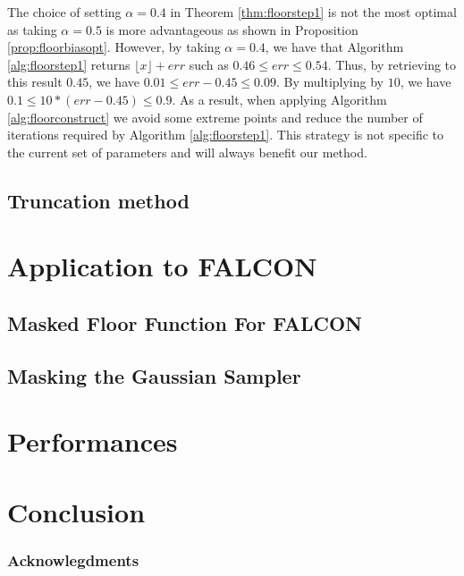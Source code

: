 \documentclass[runningheads]{llncs}
\begin{document}
\begin{remark}
  The choice of setting $\alpha=0.4$ in Theorem \ref{thm:floorstep1} is not the most optimal as taking $\alpha=0.5$ is more advantageous as shown in Proposition \ref{prop:floorbiasopt}. However, by taking $\alpha = 0.4$, we have that Algorithm \ref{alg:floorstep1} returns $\lfloor x \rfloor + err$ such as $0.46\leq err \leq 0.54$. Thus, by retrieving to this result $0.45$, we have $0.01 \leq err - 0.45 \leq 0.09$. By multiplying by $10$, we have $0.1 \leq 10*(err-0.45) \leq 0.9$. As a result, when applying Algorithm \ref{alg:floorconstruct} we avoid some extreme points and reduce the number of iterations required by Algorithm \ref{alg:floorstep1}. This strategy is not specific to the current set of parameters and will always benefit our method.
\end{remark}


\subsection{Truncation method}

\section{Application to FALCON}\label{sec:appfalcon}
\subsection{Masked Floor Function For FALCON}
\subsection{Masking the Gaussian Sampler}
\section{Performances}\label{sec:perf}

\section{Conclusion}\label{sec:conclusion}
\subsubsection{Acknowlegdments}

%
%
%
 
 
\end{document}
